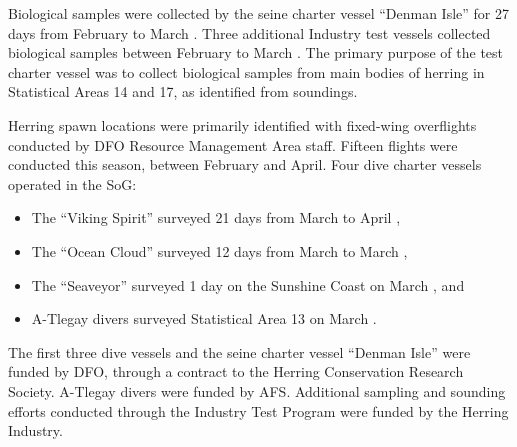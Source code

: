 Biological samples were collected by the seine charter vessel ``Denman Isle'' for 27 days from February  to March .
Three additional Industry test vessels collected biological samples between February  to March .
The primary purpose of the test charter vessel was to collect biological samples from main bodies of herring in Statistical Areas 14 and 17, as identified from soundings.

Herring spawn locations were primarily identified with fixed-wing overflights conducted by DFO Resource Management Area staff.
Fifteen flights were conducted this season, between February and April.
Four dive charter vessels operated in the SoG:
\begin{itemize}
\item The ``Viking Spirit'' surveyed 21 days from March  to April , 
\item The ``Ocean Cloud'' surveyed 12 days from March  to March ,
\item The ``Seaveyor'' surveyed 1 day on the Sunshine Coast on March , and
\item A-Tlegay divers surveyed Statistical Area 13 on March .
\end{itemize}
The first three dive vessels and the seine charter vessel ``Denman Isle'' were funded by DFO, through a contract to the Herring Conservation Research Society.
A-Tlegay divers were funded by AFS.
Additional sampling and sounding efforts conducted through the Industry Test Program were funded by the Herring Industry.